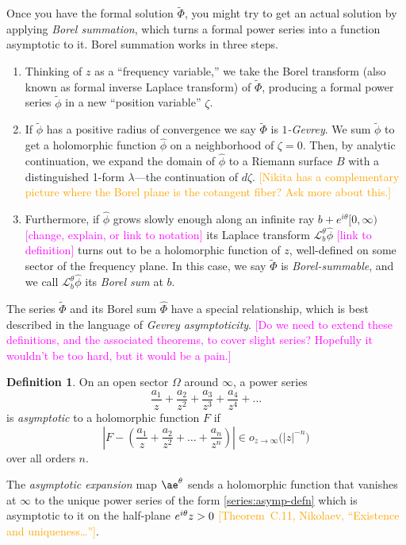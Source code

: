 \documentclass{article}
\let\Re\relax
\DeclareMathOperator{\Re}{Re}
\theoremstyle{definition}
\newtheorem{defn}{Definition}
\newcommand{\series}[1]{\tilde{#1}}
\newcommand{\laplace}{\mathcal{L}}
\newcommand{\aexp}{\ae}
\begin{document}
Once you have the formal solution $\series{\Phi}$, you might try to get an actual solution by applying {\em Borel summation}, which turns a formal power series into a function asymptotic to it. Borel summation works in three steps.
\begin{enumerate}
\item Thinking of $z$ as a ``frequency variable,'' we take the Borel transform (also known as formal inverse Laplace transform) of $\series{\Phi}$, producing a formal power series $\series{\phi}$ in a new ``position variable'' $\zeta$.
\item If $\series{\phi}$ has a positive radius of convergence we say $\series{\Phi}$ is {\em $1$-Gevrey}. We sum $\series{\phi}$ to get a holomorphic function $\hat{\phi}$ on a neighborhood of $\zeta = 0$. Then, by analytic continuation, we expand the domain of $\hat{\phi}$ to a Riemann surface $B$ with a distinguished 1-form $\lambda$---the continuation of $d\zeta$. \textcolor{orange}{[Nikita has a complementary picture where the Borel plane is the cotangent fiber? Ask more about this.]}
\item Furthermore, if $\hat{\phi}$ grows slowly enough along an infinite ray $b + e^{i\theta}[0, \infty)$ \textcolor{magenta}{[change, explain, or link to notation]} its Laplace transform $\laplace_b^\theta \hat{\phi}$ \textcolor{magenta}{[link to definition]} turns out to be a holomorphic function of $z$, well-defined on some sector of the frequency plane. In this case, we say $\tilde{\Phi}$ is {\em Borel-summable}, and we call $\laplace_b^\theta \hat{\phi}$ its {\em Borel sum} at $b$. 
\end{enumerate}
The series $\series{\Phi}$ and its Borel sum $\hat{\Phi}$ have a special relationship, which is best described in the language of {\em Gevrey asymptoticity}. \textcolor{magenta}{[Do we need to extend these definitions, and the associated theorems, to cover slight series? Hopefully it wouldn't be too hard, but it would be a pain.]}
\begin{defn}
On an open sector $\Omega$ around $\infty$, a power series
\begin{equation}\label{series:asymp-defn}
\frac{a_1}{z} + \frac{a_2}{z^2} + \frac{a_3}{z^3} + \frac{a_4}{z^4} + \ldots
\end{equation}
is {\em asymptotic} to a holomorphic function $F$ if
\[ \left|F - \left(\frac{a_1}{z} + \frac{a_2}{z^2} + \ldots + \frac{a_n}{z^n} \right) \right| \in o_{z \to \infty}\big(|z|^{-n}\big) \]
over all orders $n$.

The {\em asymptotic expansion} map $\aexp^\theta$ sends a holomorphic function that vanishes at $\infty$ to the unique power series of the form \eqref{series:asymp-defn} which is asymptotic to it on the half-plane $\Re e^{i\theta}z > 0$ \textcolor{orange}{[Theorem~C.11, Nikolaev, ``Existence and uniqueness\ldots'']}.
\end{defn}
\end{document}
